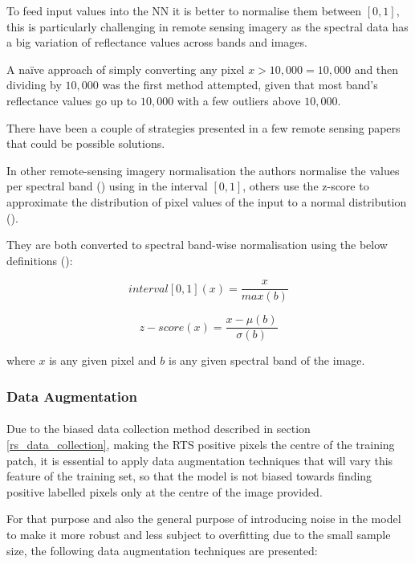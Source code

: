 To feed input values into the \gls{NN} it is better to normalise them between $[0,1]$, this is particularly challenging in remote sensing imagery as the spectral data has a big variation of reflectance values across bands and images. 

A na\"ive approach of simply converting any pixel $x>10,000 =10,000$ and then dividing by $10,000$ was the first method attempted, given that most band's reflectance values go up to $10,000$ with a few outliers above $10,000$.

There have been a couple of strategies presented in a few remote sensing papers that could be possible solutions.

In other remote-sensing imagery normalisation the authors normalise the values per spectral band (\cite{8516352}) using in the interval $[0,1]$, others use the z-score to
approximate the distribution of pixel values of the input to a normal distribution (\cite{Zhong2017SatCNNSI}). 

They are both converted to spectral band-wise normalisation using the below definitions (\cite{BELENGUERPLOMER2021112468}):

\begin{equation} \label{eq_interval}
interval [0,1](x) = \frac{x}{max(b)}
\end{equation}

\begin{equation} \label{eq_z_score}
z-score(x) = \frac{x- \mu(b)}{\sigma(b)}
\end{equation}

where $x$ is any given pixel and $b$ is any given spectral band of the image.

\subsubsection{Data Augmentation} \label{img_aug}
\paragraph{}
Due to the biased data collection method described in section \ref{rs_data_collection}, making the \gls{RTS} positive pixels the centre of the training patch, it is essential to apply data augmentation techniques that will vary this feature of the training set, so that the model is not biased towards finding positive labelled pixels only at the centre of the image provided. 

For that purpose and also the general purpose of introducing noise in the model to make it more robust and less subject to overfitting due to the small sample size, the following data augmentation techniques are presented:

